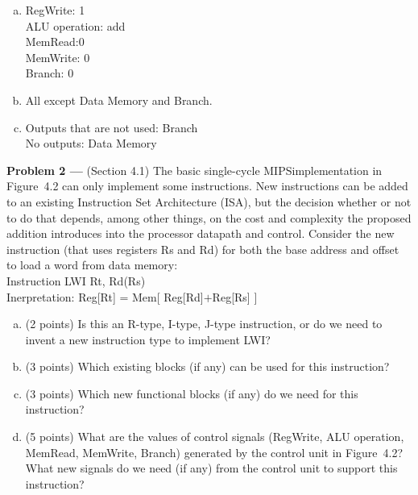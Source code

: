 \documentclass[11pt]{article}
\newcommand{\problem}[1]{\textbf{Problem #1 ---} }
\begin{document}
\begin{enumerate}[(a)]
  \item RegWrite: 1 \\
        ALU operation: add\\
        MemRead:0\\
        MemWrite: 0\\
        Branch: 0
  \item All except Data Memory and Branch.
  \item Outputs that are not used: Branch \\
        No outputs: Data Memory
\end{enumerate}
\newpage
\problem{2}(Section 4.1) The basic single-cycle MIPSimplementation in Figure~4.2 can only implement some instructions.  New instructions can be added to an existing Instruction Set Architecture (ISA), but the decision whether or not to do that depends, among other things, on the cost and complexity the proposed addition introduces into the processor datapath and control.  Consider the new instruction (that uses registers \textsf{Rs} and \textsf{Rd}) for both the base address and offset to load a word from data memory:\\
Instruction \textsf{LWI Rt, Rd(Rs)}\\
Inerpretation: \textsf{Reg[Rt] = Mem[ Reg[Rd]$+$Reg[Rs] ]}
\begin{enumerate}[(a)]
    \item (2 points) Is this an R-type, I-type, J-type instruction, or do we need to invent a new instruction type to implement \textsf{LWI}?
    \item (3 points) Which existing blocks (if any) can be used for this instruction?
    \item (3 points) Which new functional blocks (if any) do we need for this instruction?
    \item (5 points) What are the values of control signals (\textsf{RegWrite, ALU operation, MemRead, MemWrite, Branch}) generated by the control unit in Figure~4.2?  What new signals do we need (if any) from the control unit to support this instruction?
\end{enumerate}
\end{document}
